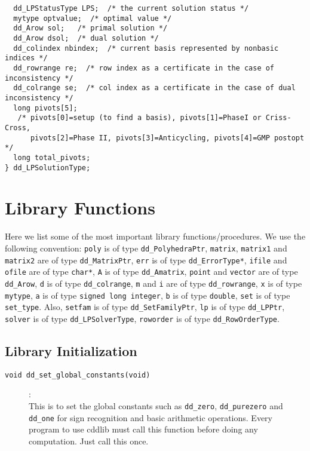 \documentclass[11pt]{article}
\newcommand {\0} {{\bf 0}}
\begin{document}
\begin{verbatim}
  dd_LPStatusType LPS;  /* the current solution status */
  mytype optvalue;  /* optimal value */
  dd_Arow sol;   /* primal solution */
  dd_Arow dsol;  /* dual solution */
  dd_colindex nbindex;  /* current basis represented by nonbasic indices */
  dd_rowrange re;  /* row index as a certificate in the case of inconsistency */
  dd_colrange se;  /* col index as a certificate in the case of dual inconsistency */
  long pivots[5]; 
   /* pivots[0]=setup (to find a basis), pivots[1]=PhaseI or Criss-Cross,
      pivots[2]=Phase II, pivots[3]=Anticycling, pivots[4]=GMP postopt  */
  long total_pivots;
} dd_LPSolutionType;

\end{verbatim}

\section{Library Functions}  \label{LIBRARY}

Here we list some of the most important library functions/procedures. 
We use the following convention: 
{\tt poly} is of type {\tt dd\_PolyhedraPtr},
{\tt matrix}, {\tt matrix1} and {\tt matrix2} are of type {\tt dd\_MatrixPtr},
{\tt err} is of type {\tt dd\_ErrorType*}, 
{\tt ifile} and {\tt ofile} are of type {\tt char*},
{\tt A} is of type {\tt dd\_Amatrix},
{\tt point} and {\tt vector} are of type {\tt dd\_Arow},
{\tt d} is of type {\tt dd\_colrange}, 
{\tt m} and {\tt i} are of type {\tt dd\_rowrange},
{\tt x} is of type {\tt mytype}, 
{\tt a} is of type {\tt signed long integer},
{\tt b} is of type {\tt double},
{\tt set} is of type {\tt set\_type}.
  Also,
{\tt setfam} is of type {\tt dd\_SetFamilyPtr},
{\tt lp} is of type {\tt dd\_LPPtr},
{\tt solver} is of type {\tt dd\_LPSolverType},
{\tt roworder} is of type {\tt dd\_RowOrderType}.


\subsection{Library Initialization}  \label{Initialization}

\begin{description}

\item[{\tt void dd\_set\_global\_constants(void)}]:\\
This is to set the global constants such as {\tt dd\_zero},
{\tt dd\_purezero} and
{\tt dd\_one} for sign recognition and basic arithmetic
operations.  {Every program to use cddlib must call this function}
before doing any computation.    Just call this once.
\end{description}
\end{document}
